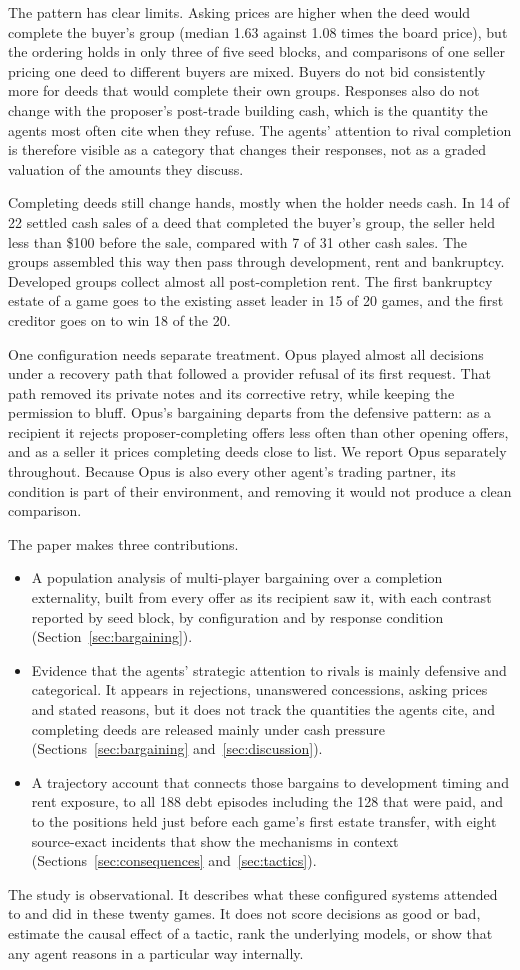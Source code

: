 The pattern has clear limits. Asking prices are higher when the deed would complete the buyer's group (median 1.63 against 1.08 times the board price), but the ordering holds in only three of five seed blocks, and comparisons of one seller pricing one deed to different buyers are mixed. Buyers do not bid consistently more for deeds that would complete their own groups. Responses also do not change with the proposer's post-trade building cash, which is the quantity the agents most often cite when they refuse. The agents' attention to rival completion is therefore visible as a category that changes their responses, not as a graded valuation of the amounts they discuss.

Completing deeds still change hands, mostly when the holder needs cash. In 14 of 22 settled cash sales of a deed that completed the buyer's group, the seller held less than \$100 before the sale, compared with 7 of 31 other cash sales. The groups assembled this way then pass through development, rent and bankruptcy. Developed groups collect almost all post-completion rent. The first bankruptcy estate of a game goes to the existing asset leader in 15 of 20 games, and the first creditor goes on to win 18 of the 20.

One configuration needs separate treatment. Opus played almost all decisions under a recovery path that followed a provider refusal of its first request. That path removed its private notes and its corrective retry, while keeping the permission to bluff. Opus's bargaining departs from the defensive pattern: as a recipient it rejects proposer-completing offers less often than other opening offers, and as a seller it prices completing deeds close to list. We report Opus separately throughout. Because Opus is also every other agent's trading partner, its condition is part of their environment, and removing it would not produce a clean comparison.

The paper makes three contributions.
\begin{itemize}
\item A population analysis of multi-player bargaining over a completion externality, built from every offer as its recipient saw it, with each contrast reported by seed block, by configuration and by response condition (Section~\ref{sec:bargaining}).
\item Evidence that the agents' strategic attention to rivals is mainly defensive and categorical. It appears in rejections, unanswered concessions, asking prices and stated reasons, but it does not track the quantities the agents cite, and completing deeds are released mainly under cash pressure (Sections~\ref{sec:bargaining} and~\ref{sec:discussion}).
\item A trajectory account that connects those bargains to development timing and rent exposure, to all 188 debt episodes including the 128 that were paid, and to the positions held just before each game's first estate transfer, with eight source-exact incidents that show the mechanisms in context (Sections~\ref{sec:consequences} and~\ref{sec:tactics}).
\end{itemize}

The study is observational. It describes what these configured systems attended to and did in these twenty games. It does not score decisions as good or bad, estimate the causal effect of a tactic, rank the underlying models, or show that any agent reasons in a particular way internally.
